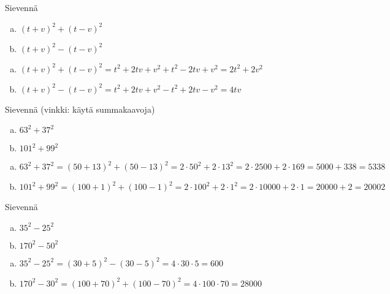 \begin{tehtava}
    Sievennä
    \begin{enumerate}[a)]
        \item $(t+v)^2+(t-v)^2$
        \item $(t+v)^2-(t-v)^2$
    \end{enumerate}
    \begin{vastaus}
        \begin{enumerate}[a)]
            \item $(t+v)^2+(t-v)^2 = t^2+2tv+v^2+t^2-2tv+v^2 = 2t^2+2v^2$
            \item $(t+v)^2-(t-v)^2 = t^2+2tv+v^2-t^2+2tv-v^2 = 4tv$
        \end{enumerate}
    \end{vastaus}
\end{tehtava}

\begin{tehtava}
    Sievennä (vinkki: käytä summakaavoja)
    \begin{enumerate}[a)]
        \item $63^2+37^2$
        \item $101^2+99^2$
    \end{enumerate}
    \begin{vastaus}
        \begin{enumerate}[a)]
            \item $63^2+37^2 = (50+13)^2+(50-13)^2 = 2\cdot 50^2 + 2\cdot 13^2 = 2\cdot 2500 +2\cdot 169 = 5000 + 338 = 5338$
            \item $101^2+99^2 = (100+1)^2+(100-1)^2 = 2\cdot 100^2 + 2\cdot 1^2 = 2\cdot 10000 + 2\cdot 1 = 20000 + 2 = 20002$
        \end{enumerate}
    \end{vastaus}
\end{tehtava}

\begin{tehtava}
    Sievennä
    \begin{enumerate}[a)]
        \item $35^2-25^2$
        \item $170^2-50^2$
    \end{enumerate}
    \begin{vastaus}
        \begin{enumerate}[a)]
            \item $35^2-25^2 = (30+5)^2-(30-5)^2 = 4\cdot 30\cdot 5 = 600$
            \item $170^2-30^2 = (100+70)^2+(100-70)^2 = 4\cdot 100\cdot 70 = 28000$
        \end{enumerate}
    \end{vastaus}
\end{tehtava}

